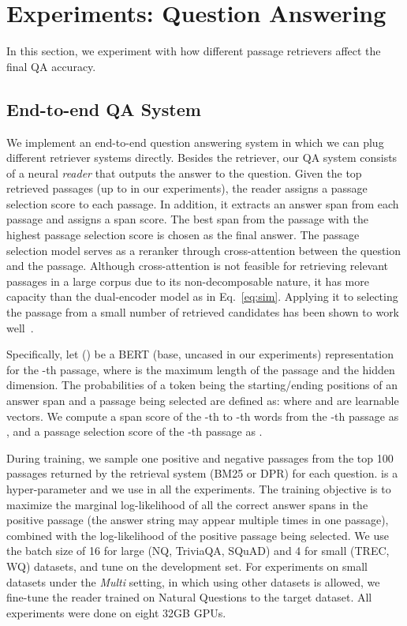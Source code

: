 \documentclass[11pt,a4paper]{article}
\begin{document}
\section{Experiments: Question Answering}
\label{sec:exp-qa}

In this section, we experiment with how different passage retrievers affect the final QA accuracy.

\subsection{End-to-end QA System}

We implement an end-to-end question answering system in which we can plug different retriever systems directly. 
Besides the retriever, our QA system consists of a neural \textit{reader} that outputs the answer to the question.
Given the top  retrieved passages (up to  in our experiments), the reader assigns a passage selection score to each passage.  
In addition, it extracts an answer span from each passage and assigns a span score.
The best span from the passage with the highest passage selection score is chosen as the final answer.
The passage selection model serves as a reranker through cross-attention between the question and the passage. 
Although cross-attention is not feasible for retrieving relevant passages in a large corpus due to its non-decomposable nature, it has more capacity than the dual-encoder model  as in Eq.~\eqref{eq:sim}. Applying it to selecting the passage from a small number of retrieved candidates has been shown to work well~\cite{wang2019multi, wang2018r, lin2018denoising}.

Specifically, let  () be a BERT (base, uncased in our experiments) representation for the -th passage, where  is the maximum length of the passage and  the hidden dimension.
The probabilities of a token being the starting/ending positions of an answer span and a passage being selected are defined as:
 where  and  are learnable vectors. 
We compute a span score of the -th to -th words from the -th passage as , and a passage selection score of the -th passage as .

During training, we sample one positive and  negative passages from the top 100 passages returned by the retrieval system (BM25 or DPR) for each question.   is a hyper-parameter and we use  in all the experiments. The training objective is to maximize the marginal log-likelihood of all the correct answer spans in the positive passage (the answer string may appear multiple times in one passage), combined with the log-likelihood of the positive passage being selected. We use the batch size of 16 for large (NQ, TriviaQA, SQuAD) and 4 for small (TREC, WQ) datasets, and tune  on the development set. For experiments on small datasets under the {\em Multi} setting, in which using other datasets is allowed, we fine-tune the reader trained on Natural Questions to the target dataset. All experiments were done on eight 32GB GPUs.
\end{document}
